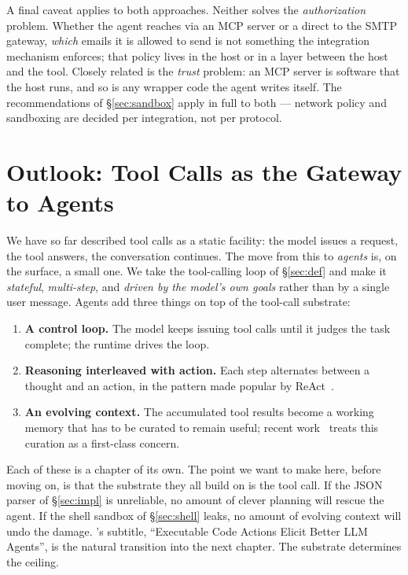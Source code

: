 \noindent
A final caveat applies to both approaches. Neither solves the
\emph{authorization} problem. Whether the agent reaches
 via an MCP server or a direct  to
the SMTP gateway, \emph{which} emails it is allowed to send is not
something the integration mechanism enforces; that policy lives in
the host or in a layer between the host and the tool. Closely
related is the \emph{trust} problem: an MCP server is software
that the host runs, and so is any wrapper code the agent writes
itself. The recommendations of \S\ref{sec:sandbox} apply in full
to both --- network policy and sandboxing are decided per
integration, not per protocol.

\section{Outlook: Tool Calls as the Gateway to Agents}
\label{sec:agents}

We have so far described tool calls as a static facility: the model
issues a request, the tool answers, the conversation continues. The
move from this to \emph{agents} is, on the surface, a small one. We
take the tool-calling loop of \S\ref{sec:def} and make it
\emph{stateful}, \emph{multi-step}, and \emph{driven by the model's
own goals} rather than by a single user message. Agents add three
things on top of the tool-call substrate:

\begin{enumerate}[label=(\roman*)]
\item \textbf{A control loop.} The model keeps issuing tool calls
  until it judges the task complete; the runtime drives the loop.
\item \textbf{Reasoning interleaved with action.} Each step
  alternates between a thought and an action, in the pattern made
  popular by ReAct~\citep{yao2023react}.
\item \textbf{An evolving context.} The accumulated tool results
  become a working memory that has to be curated to remain useful;
  recent work~\citep{zhang2025ace} treats this curation as a
  first-class concern.
\end{enumerate}

\noindent
Each of these is a chapter of its own. The point we want to make
here, before moving on, is that the substrate they all build on is
the tool call. If the JSON parser of \S\ref{sec:impl} is unreliable,
no amount of clever planning will rescue the agent. If the shell
sandbox of \S\ref{sec:shell} leaks, no amount of evolving context
will undo the damage.
\citet{wang2024codeact}'s subtitle, ``Executable Code Actions Elicit
Better LLM Agents'', is the natural transition into the next
chapter. The substrate determines the ceiling.


